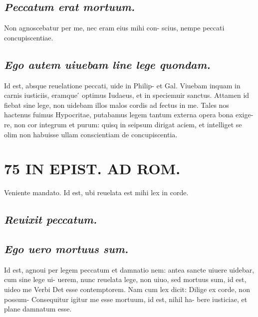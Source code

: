\documentclass{article}
\begin{document}
\begin{pages}
\subsection*{\textit{Peccatum erat mortuum. }}\pstart Non agnoscebatur per me, nec eram eius mihi con- scius, nempe peccati concupiscentiae.   \pend
{}
{}
\subsection*{\textit{Ego autem uiuebam line lege quondam. }}\pstart Id est, absque reuelatione peccati, uide in Philip- et Gal. Viuebam inquam in carnis iusticiis, eramque ́ optimus Iudaeus, et in speciemuir sanctus. Attamen id fiebat sine lege, non uidebam illos malos cordis ad fectus in me. Tales nos hactenus fuimus Hypocritae, putabamus legem tantum externa opera bona exige- re, non cor integrum et purum: quisq in seipsum dirigat aciem, et intelliget se olim non habuisse ullam conscientiam de concupiscentia.   \pend
\section*{75 IN EPIST. AD ROM.  }
\marginpar{[ p.]}\pstart Veniente mandato. Id est, ubi reuelata est mihi lex in corde.   \pend
{}
{}
\subsection*{\textit{Reuixit peccatum. }}
{}
\subsection*{\textit{Ego uero mortuus sum. }}\pstart Id est, agnoui per legem peccatum et damnatio nem: antea sancte uiuere uidebar, cum sine lege ui- uerem, nunc reuelata lege, non uiuo, sed mortuus sum, id est, uideo me Verbi Det esse contemptorem. Nam cum lex dicit: Dilige ex corde, non possum- Consequitur igitur me esse mortuum, id est, nihil ha- bere iusticiae, et plane damnatum esse.   \pend
{}
{}

\end{pages}
\end{document}
